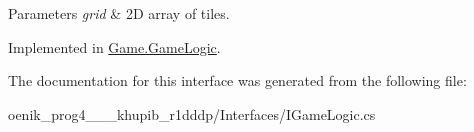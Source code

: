\begin{DoxyParams}{Parameters}
{\em grid} & 2D array of tiles.\\
\hline
\end{DoxyParams}


Implemented in \mbox{\hyperlink{class_game_1_1_game_logic_af75ecbf1983cfad3a84a6ccbe5c9808f}{Game.\+Game\+Logic}}.



The documentation for this interface was generated from the following file\+:\begin{DoxyCompactItemize}
\item 
oenik\+\_\+prog4\+\_\+\_\+\_\+khupib\+\_\+r1dddp/\+Interfaces/I\+Game\+Logic.\+cs\end{DoxyCompactItemize}
